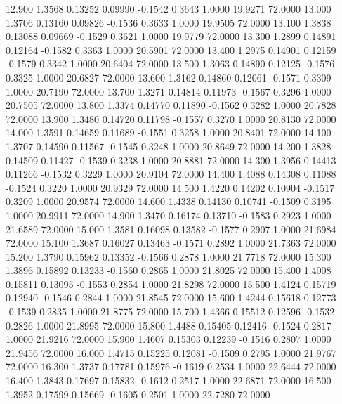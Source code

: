   12.900   1.3568   0.13252   0.09990  -0.1542   0.3643   1.0000  19.9271  72.0000
  13.000   1.3706   0.13160   0.09826  -0.1536   0.3633   1.0000  19.9505  72.0000
  13.100   1.3838   0.13088   0.09669  -0.1529   0.3621   1.0000  19.9779  72.0000
  13.300   1.2899   0.14891   0.12164  -0.1582   0.3363   1.0000  20.5901  72.0000
  13.400   1.2975   0.14901   0.12159  -0.1579   0.3342   1.0000  20.6404  72.0000
  13.500   1.3063   0.14890   0.12125  -0.1576   0.3325   1.0000  20.6827  72.0000
  13.600   1.3162   0.14860   0.12061  -0.1571   0.3309   1.0000  20.7190  72.0000
  13.700   1.3271   0.14814   0.11973  -0.1567   0.3296   1.0000  20.7505  72.0000
  13.800   1.3374   0.14770   0.11890  -0.1562   0.3282   1.0000  20.7828  72.0000
  13.900   1.3480   0.14720   0.11798  -0.1557   0.3270   1.0000  20.8130  72.0000
  14.000   1.3591   0.14659   0.11689  -0.1551   0.3258   1.0000  20.8401  72.0000
  14.100   1.3707   0.14590   0.11567  -0.1545   0.3248   1.0000  20.8649  72.0000
  14.200   1.3828   0.14509   0.11427  -0.1539   0.3238   1.0000  20.8881  72.0000
  14.300   1.3956   0.14413   0.11266  -0.1532   0.3229   1.0000  20.9104  72.0000
  14.400   1.4088   0.14308   0.11088  -0.1524   0.3220   1.0000  20.9329  72.0000
  14.500   1.4220   0.14202   0.10904  -0.1517   0.3209   1.0000  20.9574  72.0000
  14.600   1.4338   0.14130   0.10741  -0.1509   0.3195   1.0000  20.9911  72.0000
  14.900   1.3470   0.16174   0.13710  -0.1583   0.2923   1.0000  21.6589  72.0000
  15.000   1.3581   0.16098   0.13582  -0.1577   0.2907   1.0000  21.6984  72.0000
  15.100   1.3687   0.16027   0.13463  -0.1571   0.2892   1.0000  21.7363  72.0000
  15.200   1.3790   0.15962   0.13352  -0.1566   0.2878   1.0000  21.7718  72.0000
  15.300   1.3896   0.15892   0.13233  -0.1560   0.2865   1.0000  21.8025  72.0000
  15.400   1.4008   0.15811   0.13095  -0.1553   0.2854   1.0000  21.8298  72.0000
  15.500   1.4124   0.15719   0.12940  -0.1546   0.2844   1.0000  21.8545  72.0000
  15.600   1.4244   0.15618   0.12773  -0.1539   0.2835   1.0000  21.8775  72.0000
  15.700   1.4366   0.15512   0.12596  -0.1532   0.2826   1.0000  21.8995  72.0000
  15.800   1.4488   0.15405   0.12416  -0.1524   0.2817   1.0000  21.9216  72.0000
  15.900   1.4607   0.15303   0.12239  -0.1516   0.2807   1.0000  21.9456  72.0000
  16.000   1.4715   0.15225   0.12081  -0.1509   0.2795   1.0000  21.9767  72.0000
  16.300   1.3737   0.17781   0.15976  -0.1619   0.2534   1.0000  22.6444  72.0000
  16.400   1.3843   0.17697   0.15832  -0.1612   0.2517   1.0000  22.6871  72.0000
  16.500   1.3952   0.17599   0.15669  -0.1605   0.2501   1.0000  22.7280  72.0000
